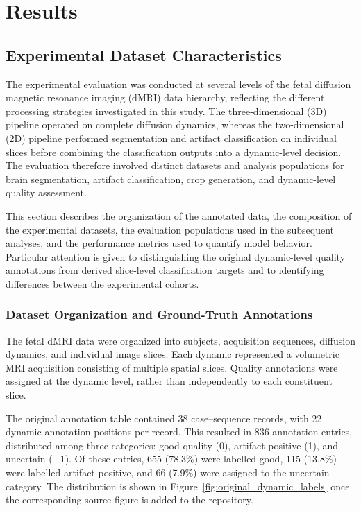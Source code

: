 \chapter{Results}

\section{Experimental Dataset Characteristics}
\label{sec:results_evaluation_framework}

The experimental evaluation was conducted at several levels of the fetal diffusion magnetic resonance imaging (dMRI) data hierarchy, reflecting the different processing strategies investigated in this study. The three-dimensional (3D) pipeline operated on complete diffusion dynamics, whereas the two-dimensional (2D) pipeline performed segmentation and artifact classification on individual slices before combining the classification outputs into a dynamic-level decision. The evaluation therefore involved distinct datasets and analysis populations for brain segmentation, artifact classification, crop generation, and dynamic-level quality assessment.

This section describes the organization of the annotated data, the composition of the experimental datasets, the evaluation populations used in the subsequent analyses, and the performance metrics used to quantify model behavior. Particular attention is given to distinguishing the original dynamic-level quality annotations from derived slice-level classification targets and to identifying differences between the experimental cohorts.

\subsection{Dataset Organization and Ground-Truth Annotations}
\label{subsec:results_annotations}

The fetal dMRI data were organized into subjects, acquisition sequences, diffusion dynamics, and individual image slices. Each dynamic represented a volumetric MRI acquisition consisting of multiple spatial slices. Quality annotations were assigned at the dynamic level, rather than independently to each constituent slice.

The original annotation table contained 38 case--sequence records, with 22 dynamic annotation positions per record. This resulted in 836 annotation entries, distributed among three categories: good quality (0), artifact-positive (1), and uncertain ($-1$). Of these entries, 655 (78.3\%) were labelled good, 115 (13.8\%) were labelled artifact-positive, and 66 (7.9\%) were assigned to the uncertain category. The distribution is shown in Figure~\ref{fig:original_dynamic_labels} once the corresponding source figure is added to the repository.

